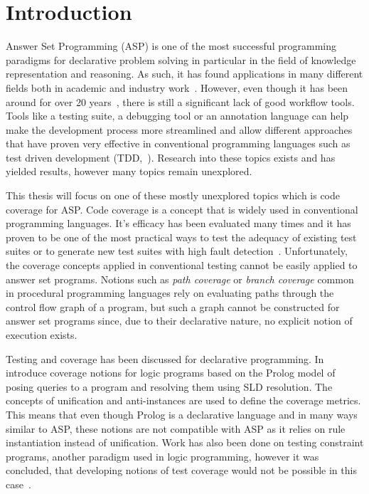 \chapter{Introduction}
\label{ch:Introduction}
Answer Set Programming (ASP) is one of the most successful programming paradigms for declarative problem solving in particular in the field of knowledge representation and reasoning. As such, it has found applications in many different fields both in academic and industry work~\cite{EGL16}.
However, even though it has been around for over 20 years~\cite{Nie99, MT98}, there is still a significant lack of good workflow tools. Tools like a testing suite, a debugging tool or an annotation language can help make the development process more streamlined and allow different approaches that have proven very effective in conventional programming languages such as test driven development (TDD,~\cite{Fra+03}). Research into these topics exists and has yielded results, however many topics remain unexplored.

This thesis will focus on one of these mostly unexplored topics which is code coverage for ASP. Code coverage is a concept that is widely used in conventional programming languages. It's efficacy has been evaluated many times and it has proven to be one of the most practical ways to test the adequacy of existing test suites or to generate new test suites with high fault detection~\cite{GJG14}.
Unfortunately, the coverage concepts applied in conventional testing cannot be easily applied to answer set programs. Notions such as \emph{path coverage} or \emph{branch coverage} common in procedural programming languages rely on evaluating paths through the control flow graph of a program, but such a graph cannot be constructed for answer set programs since, due to their declarative nature, no explicit notion of execution exists.

Testing and coverage has been discussed for declarative programming. In~\cite{BJ98} \citeauthor{BJ98} introduce coverage notions for logic programs based on the Prolog model of posing queries to a program and resolving them using SLD resolution. The concepts of unification and anti-instances are used to define the coverage metrics. This means that even though Prolog is a declarative language and in many ways similar to ASP, these notions are not compatible with ASP as it relies on rule instantiation instead of unification.
Work has also been done on testing constraint programs, another paradigm used in logic programming, however it was concluded, that developing notions of test coverage would not be possible in this case~\cite{LGL10}.


